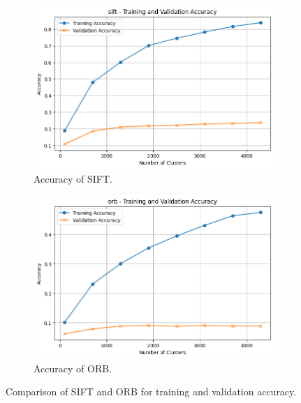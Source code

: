 \documentclass[12pt]{article}
\begin{document}
\begin{figure}[H]
    \centering
    \begin{subfigure}[b]{0.3\textwidth} %
        \centering
        \includegraphics[width=\textwidth]{figures/sift.png} %
        \caption{Accuracy of SIFT.}
        \label{fig:efficiency_chart}
    \end{subfigure}
    \hspace{0.01\textwidth} %
    \begin{subfigure}[b]{0.3\textwidth} %
        \centering
        \includegraphics[width=\textwidth]{figures/orb.png} %
        \caption{Accuracy of ORB.}
        \label{fig:accuracy_vs_clusters}
    \end{subfigure}
    \caption{Comparison of SIFT and ORB for training and validation accuracy.}
    \label{fig:side_by_side}
\end{figure}
\end{document}
